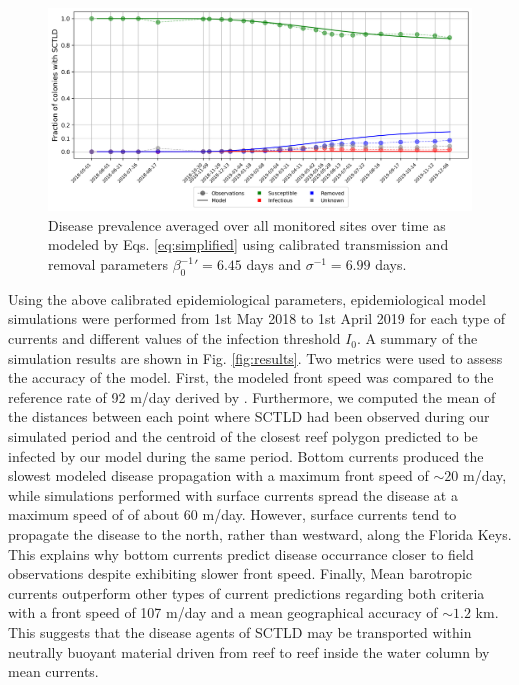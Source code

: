 \documentclass[utf8]{frontiersSCNS}
\begin{document}
\begin{figure}
    \centering
    \includegraphics[width=.95\textwidth]{figures/sir_obs.png}
    \caption{Disease prevalence averaged over all monitored sites over time as modeled by Eqs. \ref{eq:simplified} using calibrated transmission and removal parameters $\beta_0^{-1}'=6.45$ days and $\sigma^{-1}=6.99$ days.}
    \label{fig:calibration}
\end{figure}

Using the above calibrated epidemiological parameters, epidemiological model simulations were performed from 1st May 2018 to 1st April 2019 for each type of currents and different values of the infection threshold $I_0$. A summary of the simulation results are shown in Fig. \ref{fig:results}. Two metrics were used to assess the accuracy of the model. First, the modeled front speed was compared to the reference rate of 92 m/day derived by \cite{muller2020spatial}. Furthermore, we computed the mean of the distances between each point where SCTLD had been observed during our simulated period and the centroid of the closest reef polygon predicted to be infected by our model during the same period. %
Bottom currents produced the slowest modeled disease propagation with a maximum front speed of $\sim 20$ m/day, while simulations performed with surface currents spread the disease at a maximum speed of of about 60 m/day. However, surface currents tend to propagate the disease to the north, rather than westward, along the Florida Keys. This explains why bottom currents predict disease occurrance closer to field observations despite exhibiting slower front speed. Finally, Mean barotropic currents outperform other types of current predictions regarding both criteria with a front speed of 107 m/day and a mean geographical accuracy of $\sim1.2$ km. This suggests that the disease agents of SCTLD may be transported within neutrally buoyant material driven from reef to reef inside the water column by mean currents.
\end{document}
